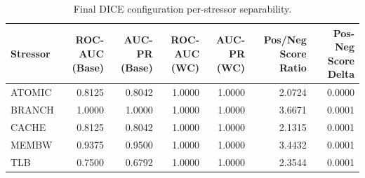 \begin{table}[t]
\centering
\caption{Final DICE configuration per-stressor separability.}
\label{tab:dice_full_stressor}
\footnotesize
\begin{tabular}{lrrrrrr}
\toprule
Stressor & ROC-AUC (Base) & AUC-PR (Base) & ROC-AUC (WC) & AUC-PR (WC) & Pos/Neg Score Ratio & Pos-Neg Score Delta \\
\midrule
ATOMIC & 0.8125 & 0.8042 & 1.0000 & 1.0000 & 2.0724 & 0.0000 \\
BRANCH & 1.0000 & 1.0000 & 1.0000 & 1.0000 & 3.6671 & 0.0001 \\
CACHE & 0.8125 & 0.8042 & 1.0000 & 1.0000 & 2.1315 & 0.0001 \\
MEMBW & 0.9375 & 0.9500 & 1.0000 & 1.0000 & 3.4432 & 0.0001 \\
TLB & 0.7500 & 0.6792 & 1.0000 & 1.0000 & 2.3544 & 0.0001 \\
\bottomrule
\end{tabular}

\end{table}
